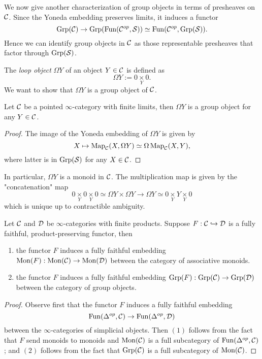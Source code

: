 We now give another characterization of group objects in terms of presheaves on ${\mathcal{C}}$.
Since the Yoneda embedding preserves limits, it induces a functor
$$
\operatorname{Grp}({\mathcal{C}}) \to  \operatorname{Grp}(\operatorname{Fun}({\mathcal{C}}^{op}, \operatorname{\mathcal{S}})) \simeq \operatorname{Fun}({\mathcal{C}}^{op}, \operatorname{Grp}(\operatorname{\mathcal{S}})).
$$
Hence we can identify group objects in ${\mathcal{C}}$ as those representable presheaves that factor through $\operatorname{Grp}(\operatorname{\mathcal{S}})$. 

The \emph{loop object} $\Omega Y$ of an object $Y\in {\mathcal{C}}$ is defined as
$$
\Omega Y:=0 \underset { Y }{\times } 0.
$$
We want to show that $\Omega Y$ is a group object of ${\mathcal{C}}$. 
\begin{lemma}
\label{Loop of an object is a group}
    Let ${\mathcal{C}}$ be a pointed $\infty$-category with finite limits, then $\Omega Y$ is a group object for any $Y\in {\mathcal{C}}$.
\end{lemma}
\begin{proof}
    The image of the Yoneda embedding of $\Omega Y$ is given by 
    $$
    X \mapsto \operatorname{Map}_{{\mathcal{C}}}(X, \Omega Y)\simeq \Omega \operatorname{Map}_{{\mathcal{C}}}(X, Y),
    $$
    where latter is in $\operatorname{Grp}(\operatorname{\mathcal{S}})$ for any $X\in {\mathcal{C}}$.
\end{proof}
\begin{remark}
In particular, $\Omega Y$ is a monoid in ${\mathcal{C}}$. The multiplication map is given by the "concatenation" map
$$
0 \underset { Y }{\times } 0 \underset { Y }{\times } 0
\simeq\Omega Y\times \Omega Y\rightarrow \Omega Y\simeq 0\underset{Y}{\times}Y\underset{Y}{\times} 0 
$$
which is unique up to contractible ambiguity. 
\end{remark}


\begin{proposition}
\label{induced fully faithfulness on group objects}
Let ${\mathcal{C}}$ and ${\mathcal{D}}$ be $\infty$-categories with finite products. Suppose $F:{\mathcal{C}} \hookrightarrow {\mathcal{D}}$ is a fully faithful, product-preserving functor, then
	\begin{enumerate}[(1)]
		\item the functor $F$ induces a fully faithful embedding $\operatorname{Mon}(F):\operatorname{Mon}({\mathcal{C}})\to \operatorname{Mon}({\mathcal{D}})$ between the category of associative monoids.
		\item the functor $F$ induces a fully faithful embedding $\operatorname{Grp}(F):\operatorname{Grp}({\mathcal{C}})\to \operatorname{Grp}({\mathcal{D}})$ between the category of group objects.
	\end{enumerate}
\end{proposition}
\begin{proof}
	Observe first that the functor $F$ induces a fully faithful embedding 
	$$
	\operatorname{Fun}(\Delta^{op},{\mathcal{C}})\to \operatorname{Fun}(\Delta^{op},{\mathcal{D}})
	$$ between the $\infty$-categories of simplicial objects.
	Then $(1)$ follows from the fact that $F$ send monoids to monoids and $\operatorname{Mon}({\mathcal{C}})$ is a full subcategory of $\operatorname{Fun}(\Delta^{op},{\mathcal{C}})$; and $(2)$ follows from the fact that $\operatorname{Grp}({\mathcal{C}})$ is a full subcategory of $\operatorname{Mon}({\mathcal{C}})$.
\end{proof}





